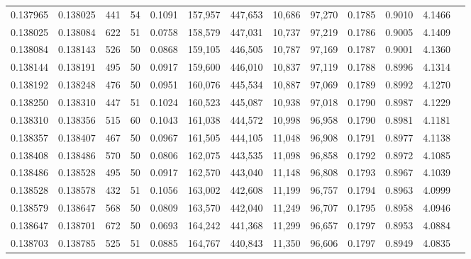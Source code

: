 \begin{tabular}{rrrrrrrrrrrrr}
0.137965 & 0.138025 &   441 &  54 &                                     0.1091 & 157,957 & 447,653 &  10,686 &  97,270 & 0.1785 & 0.9010 & 4.1466 \\
0.138025 & 0.138084 &   622 &  51 &                                     0.0758 & 158,579 & 447,031 &  10,737 &  97,219 & 0.1786 & 0.9005 & 4.1409 \\
0.138084 & 0.138143 &   526 &  50 &                                     0.0868 & 159,105 & 446,505 &  10,787 &  97,169 & 0.1787 & 0.9001 & 4.1360 \\
0.138144 & 0.138191 &   495 &  50 &                                     0.0917 & 159,600 & 446,010 &  10,837 &  97,119 & 0.1788 & 0.8996 & 4.1314 \\
0.138192 & 0.138248 &   476 &  50 &                                     0.0951 & 160,076 & 445,534 &  10,887 &  97,069 & 0.1789 & 0.8992 & 4.1270 \\
0.138250 & 0.138310 &   447 &  51 &                                     0.1024 & 160,523 & 445,087 &  10,938 &  97,018 & 0.1790 & 0.8987 & 4.1229 \\
0.138310 & 0.138356 &   515 &  60 &                                     0.1043 & 161,038 & 444,572 &  10,998 &  96,958 & 0.1790 & 0.8981 & 4.1181 \\
0.138357 & 0.138407 &   467 &  50 &                                     0.0967 & 161,505 & 444,105 &  11,048 &  96,908 & 0.1791 & 0.8977 & 4.1138 \\
0.138408 & 0.138486 &   570 &  50 &                                     0.0806 & 162,075 & 443,535 &  11,098 &  96,858 & 0.1792 & 0.8972 & 4.1085 \\
0.138486 & 0.138528 &   495 &  50 &                                     0.0917 & 162,570 & 443,040 &  11,148 &  96,808 & 0.1793 & 0.8967 & 4.1039 \\
0.138528 & 0.138578 &   432 &  51 &                                     0.1056 & 163,002 & 442,608 &  11,199 &  96,757 & 0.1794 & 0.8963 & 4.0999 \\
0.138579 & 0.138647 &   568 &  50 &                                     0.0809 & 163,570 & 442,040 &  11,249 &  96,707 & 0.1795 & 0.8958 & 4.0946 \\
0.138647 & 0.138701 &   672 &  50 &                                     0.0693 & 164,242 & 441,368 &  11,299 &  96,657 & 0.1797 & 0.8953 & 4.0884 \\
0.138703 & 0.138785 &   525 &  51 &                                     0.0885 & 164,767 & 440,843 &  11,350 &  96,606 & 0.1797 & 0.8949 & 4.0835 \\

\end{tabular}

